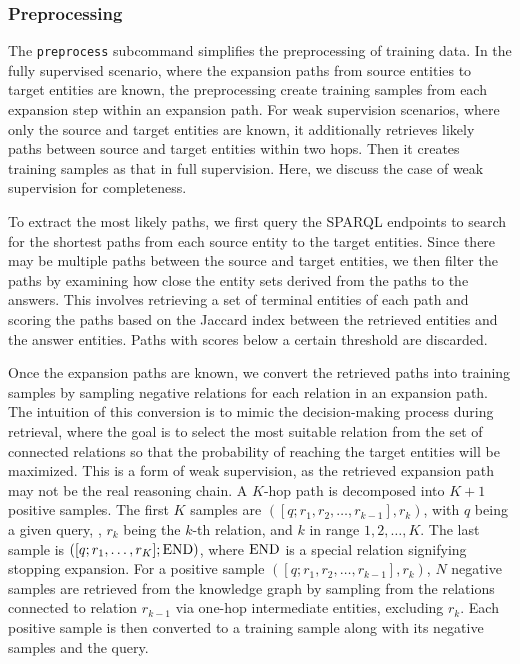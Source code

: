 \documentclass[runningheads]{llncs}
\begin{document}
\subsubsection{Preprocessing}


The \texttt{preprocess} subcommand simplifies the preprocessing of training data. In the fully supervised scenario, where the expansion paths from source entities to target entities are known, the preprocessing create training samples from each expansion step within an expansion path. For weak supervision scenarios, where only the source and target entities are known, it additionally retrieves likely paths between source and target entities within two hops. Then it creates training samples as that in full supervision. Here, we discuss the case of weak supervision for completeness.

To extract the most likely paths, we first query the SPARQL endpoints to search for the shortest paths from each source entity to the target entities. Since there may be multiple paths between the source and target entities, we then filter the paths by examining how close the entity sets derived from the paths to the answers. This involves retrieving a set of terminal entities of each path and scoring the paths based on the Jaccard index between the retrieved entities and the answer entities. Paths with scores below a certain threshold are discarded.

Once the expansion paths are known, we convert the retrieved paths into training samples by sampling negative relations for each relation in an expansion path. The intuition of this conversion is to mimic the decision-making process during retrieval, where the goal is to select the most suitable relation from the set of connected relations so that the probability of reaching the target entities will be maximized. This is a form of weak supervision, as the retrieved expansion path may not be the real reasoning chain. A $K$-hop path is decomposed into $K+1$ positive samples. The first $K$ samples are $([q; r_1, r_2, \ldots, \allowbreak r_{k-1}], r_k)$, with $q$ being a given query, , $r_k$ being the $k$-th relation, and $k$ in range $1,2,\ldots,K$. The last sample is $([q; r_1,\ldots, r_K]; \textnormal{END})$, where $\textnormal{END}$ is a special relation signifying stopping expansion.  For a positive sample $([q; r_1, r_2, \ldots, r_{k-1}], r_k)$, $N$ negative samples are retrieved from the knowledge graph by sampling from the relations connected to relation $r_{k-1}$ via one-hop intermediate entities, excluding $r_k$. Each positive sample is then converted to a training sample along with its negative samples and the query.
\end{document}
